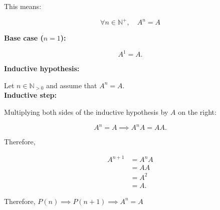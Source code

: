 This means:

    $$
    \boxed{\forall n\in\mathbb{N^+},\quad A^n=A}
    $$

    \textbf{Base case ($n=1$):}

    $$
    A^1=A.
    $$

    \textbf{Inductive hypothesis:}

    Let $n\in\mathbb{N}_{>0}$ and assume that $A^n=A$.\\

    \textbf{Inductive step:}

    Multiplying both sides of the inductive hypothesis
    by $A$ on the right:

    $$
    A^n=A \implies A^nA=AA.
    $$

    Therefore,

    $$
    \begin{aligned}
        A^{n+1}
        &= A^nA \\
        &= AA \\
        &= A^2 \\
        &= A.
    \end{aligned}
    $$

    Therefore, $P(n)\implies P(n+1) \implies \boxed{A^n = A}$

